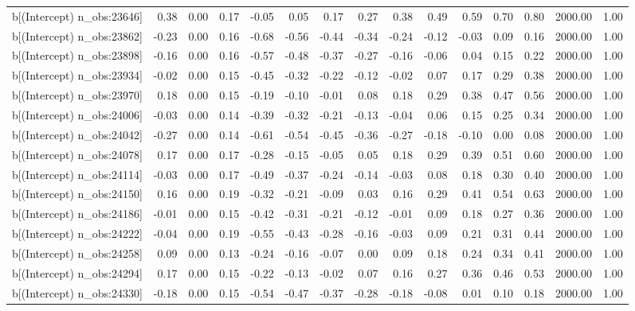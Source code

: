 \begin{table}[ht]
\begin{tabular}{rrrrrrrrrrrrrrr}
  b[(Intercept) n\_obs:23646] & 0.38 & 0.00 & 0.17 & -0.05 & 0.05 & 0.17 & 0.27 & 0.38 & 0.49 & 0.59 & 0.70 & 0.80 & 2000.00 & 1.00 \\ 
  b[(Intercept) n\_obs:23862] & -0.23 & 0.00 & 0.16 & -0.68 & -0.56 & -0.44 & -0.34 & -0.24 & -0.12 & -0.03 & 0.09 & 0.16 & 2000.00 & 1.00 \\ 
  b[(Intercept) n\_obs:23898] & -0.16 & 0.00 & 0.16 & -0.57 & -0.48 & -0.37 & -0.27 & -0.16 & -0.06 & 0.04 & 0.15 & 0.22 & 2000.00 & 1.00 \\ 
  b[(Intercept) n\_obs:23934] & -0.02 & 0.00 & 0.15 & -0.45 & -0.32 & -0.22 & -0.12 & -0.02 & 0.07 & 0.17 & 0.29 & 0.38 & 2000.00 & 1.00 \\ 
  b[(Intercept) n\_obs:23970] & 0.18 & 0.00 & 0.15 & -0.19 & -0.10 & -0.01 & 0.08 & 0.18 & 0.29 & 0.38 & 0.47 & 0.56 & 2000.00 & 1.00 \\ 
  b[(Intercept) n\_obs:24006] & -0.03 & 0.00 & 0.14 & -0.39 & -0.32 & -0.21 & -0.13 & -0.04 & 0.06 & 0.15 & 0.25 & 0.34 & 2000.00 & 1.00 \\ 
  b[(Intercept) n\_obs:24042] & -0.27 & 0.00 & 0.14 & -0.61 & -0.54 & -0.45 & -0.36 & -0.27 & -0.18 & -0.10 & 0.00 & 0.08 & 2000.00 & 1.00 \\ 
  b[(Intercept) n\_obs:24078] & 0.17 & 0.00 & 0.17 & -0.28 & -0.15 & -0.05 & 0.05 & 0.18 & 0.29 & 0.39 & 0.51 & 0.60 & 2000.00 & 1.00 \\ 
  b[(Intercept) n\_obs:24114] & -0.03 & 0.00 & 0.17 & -0.49 & -0.37 & -0.24 & -0.14 & -0.03 & 0.08 & 0.18 & 0.30 & 0.40 & 2000.00 & 1.00 \\ 
  b[(Intercept) n\_obs:24150] & 0.16 & 0.00 & 0.19 & -0.32 & -0.21 & -0.09 & 0.03 & 0.16 & 0.29 & 0.41 & 0.54 & 0.63 & 2000.00 & 1.00 \\ 
  b[(Intercept) n\_obs:24186] & -0.01 & 0.00 & 0.15 & -0.42 & -0.31 & -0.21 & -0.12 & -0.01 & 0.09 & 0.18 & 0.27 & 0.36 & 2000.00 & 1.00 \\ 
  b[(Intercept) n\_obs:24222] & -0.04 & 0.00 & 0.19 & -0.55 & -0.43 & -0.28 & -0.16 & -0.03 & 0.09 & 0.21 & 0.31 & 0.44 & 2000.00 & 1.00 \\ 
  b[(Intercept) n\_obs:24258] & 0.09 & 0.00 & 0.13 & -0.24 & -0.16 & -0.07 & 0.00 & 0.09 & 0.18 & 0.24 & 0.34 & 0.41 & 2000.00 & 1.00 \\ 
  b[(Intercept) n\_obs:24294] & 0.17 & 0.00 & 0.15 & -0.22 & -0.13 & -0.02 & 0.07 & 0.16 & 0.27 & 0.36 & 0.46 & 0.53 & 2000.00 & 1.00 \\ 
  b[(Intercept) n\_obs:24330] & -0.18 & 0.00 & 0.15 & -0.54 & -0.47 & -0.37 & -0.28 & -0.18 & -0.08 & 0.01 & 0.10 & 0.18 & 2000.00 & 1.00 \\ 

\end{tabular}
\end{table}

